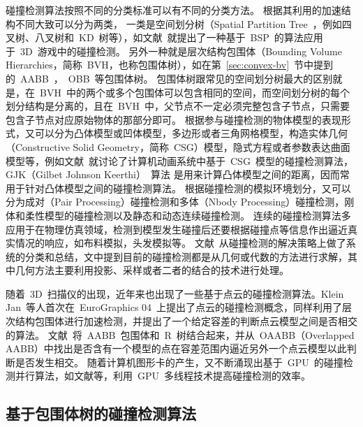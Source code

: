 碰撞检测算法按照不同的分类标准可以有不同的分类方法。
根据其利用的加速结构不同大致可以分为两类，
一类是空间划分树（Spatial Partition Tree~，例如四叉树、八叉树和~KD~树等），如文献~就提出了一种基于~BSP~的算法应用于~3D~游戏中的碰撞检测。
另外一种就是层次结构包围体（Bounding Volume Hierarchies，简称~BVH，也称包围体树），如在第~\ref{sec:convex-bv}~节中提到的~AABB~，~OBB~等包围体树。
包围体树跟常见的空间划分树最大的区别就是，在~BVH~中的两个或多个包围体可以包含相同的空间，而空间划分树的每个划分结构是分离的，且在~BVH~中，父节点不一定必须完整包含子节点，只需要包含子节点对应原始物体的那部分即可\cite{ericson2005real}。 
根据参与碰撞检测的物体模型的表现形式，又可以分为凸体模型或凹体模型，多边形或者三角网格模型，构造实体几何（Constructive
Solid Geometry，简称~CSG）模型，隐式方程或者参数表达曲面模型等，例如文献~就讨论了计算机动画系统中基于~CSG~模型的碰撞检测算法，GJK（Gilbet Johnson Keerthi）~算法\cite{gilbert1988fast,bergen1999fast}
是用来计算凸体模型之间的距离，因而常用于针对凸体模型之间的碰撞检测算法。
根据碰撞检测的模拟环境划分，又可以分为成对（Pair Processing）碰撞检测和多体（Nbody Processing）碰撞检测，刚体和柔性模型的碰撞检测以及静态和动态连续碰撞检测\cite{lin1998collision}。
连续的碰撞检测算法多应用于在物理仿真领域，检测到模型发生碰撞后还要根据碰撞点等信息作出逼近真实情况的响应，如布料模拟\cite{Brochu2012,Wang2014}，头发模拟\cite{Kaufman2014,Chai2014}等。
文献~从碰撞检测的解决策略上做了系统的分类和总结，文中提到目前的碰撞检测都是从几何或代数的方法进行求解，其中几何方法主要利用投影、采样或者二者的结合的技术进行处理。

随着~3D~扫描仪的出现，近年来也出现了一些基于点云的碰撞检测算法。Klein Jan~等人\cite{klein2004point}首次在~EuroGraphics 04~上提出了点云的碰撞检测概念，同样利用了层次结构包围体进行加速检测，并提出了一个给定容差的判断点云模型之间是否相交的算法。
文献~将~AABB~包围体和~R~树结合起来，并从~OAABB（Overlapped AABB）中找出是否含有一个模型的点在容差范围内逼近另外一个点云模型以此判断是否发生相交。
随着计算机图形卡的产生，又不断涌现出基于~GPU~的碰撞检测并行算法，如文献等，利用~GPU~多线程技术提高碰撞检测的效率。

\subsection{基于包围体树的碰撞检测算法}
\label{sec:cd-bvh}

